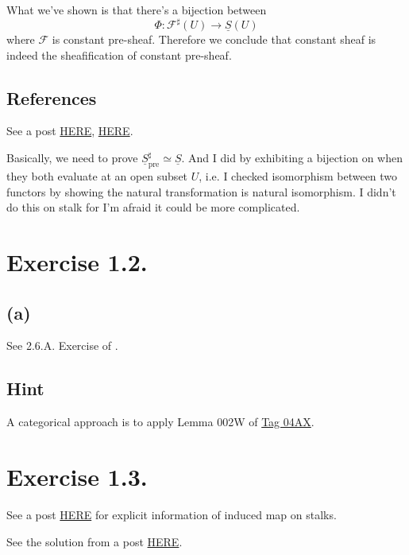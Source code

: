 What we've shown is that there's a bijection between 
\[\Phi:\mathscr F^{\sharp}(U)\to\underline{S}(U)\] where $\mathscr F$ is constant pre-sheaf. Therefore we conclude that constant sheaf is indeed the sheafification of constant pre-sheaf.

\subsection{References}

See a post \href{https://math.stackexchange.com/questions/249961/sheafification-of-the-constant-presheaf}{HERE}, \href{https://math.stackexchange.com/questions/3834390/sheafification-of-constant-presheaf}{HERE}.

Basically, we need to prove $\underline{S}_{\text{pre}}^{\sharp}\simeq \underline{S}$. And I did by exhibiting a bijection on when they both evaluate at an open subset $U$, i.e. I checked isomorphism between two functors by showing the natural transformation is natural isomorphism.
I didn't do this on stalk for I'm afraid it could be more complicated.

\section{Exercise 1.2.}

\subsection{(a)}

See 2.6.A. Exercise  of \cite{RaviRisingSea}.

\subsection{Hint}

A categorical approach is to apply Lemma 002W of \href{https://stacks.math.columbia.edu/tag/04AX}{Tag 04AX}.

\section{Exercise 1.3.}

See a post \href{https://math.stackexchange.com/questions/1387214/the-induced-map-on-stalks-is-well-defined}{HERE} for explicit information of induced map on stalks. 

See the solution from a post \href{https://math.stackexchange.com/questions/4450406/surjective-morphism-of-sheaves}{HERE}.

